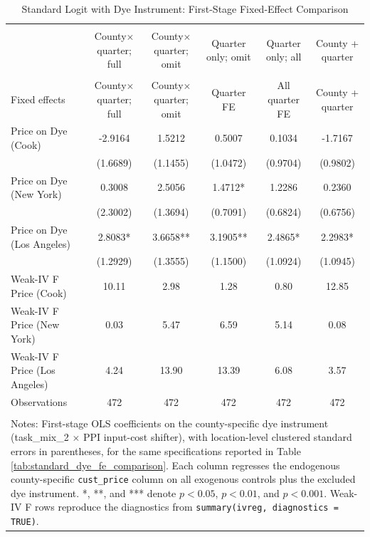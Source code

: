\begin{table}[!htbp] \centering
  \caption{Standard Logit with Dye Instrument: First-Stage Fixed-Effect Comparison}
  \label{tab:standard_dye_fe_comparison_first_stage}
  \begin{tabular}{lccccc}
\\[-1.8ex]\hline
\hline \\[-1.8ex]
 & County$\times$quarter; full & County$\times$quarter; omit & Quarter only; omit & Quarter only; all & County + quarter \\
\hline \\[-1.8ex]
Fixed effects & County$\times$quarter; full & County$\times$quarter; omit & Quarter FE & All quarter FE & County + quarter \\
Price on Dye (Cook) & -2.9164 & 1.5212 & 0.5007 & 0.1034 & -1.7167 \\
 & (1.6689) & (1.1455) & (1.0472) & (0.9704) & (0.9802) \\
Price on Dye (New York) & 0.3008 & 2.5056 & 1.4712* & 1.2286 & 0.2360 \\
 & (2.3002) & (1.3694) & (0.7091) & (0.6824) & (0.6756) \\
Price on Dye (Los Angeles) & 2.8083* & 3.6658** & 3.1905** & 2.4865* & 2.2983* \\
 & (1.2929) & (1.3555) & (1.1500) & (1.0924) & (1.0945) \\
Weak-IV F Price (Cook) & 10.11 & 2.98 & 1.28 & 0.80 & 12.85 \\
Weak-IV F Price (New York) & 0.03 & 5.47 & 6.59 & 5.14 & 0.08 \\
Weak-IV F Price (Los Angeles) & 4.24 & 13.90 & 13.39 & 6.08 & 3.57 \\
Observations & 472 & 472 & 472 & 472 & 472 \\
\hline \\[-1.8ex]
\multicolumn{6}{p{0.92\linewidth}}{\footnotesize Notes: First-stage OLS coefficients on the county-specific dye instrument (task\_mix\_2 $\times$ PPI input-cost shifter), with location-level clustered standard errors in parentheses, for the same specifications reported in Table \ref{tab:standard_dye_fe_comparison}. Each column regresses the endogenous county-specific \texttt{cust\_price} column on all exogenous controls plus the excluded dye instrument. *, **, and *** denote $p<0.05$, $p<0.01$, and $p<0.001$. Weak-IV F rows reproduce the diagnostics from \texttt{summary(ivreg, diagnostics = TRUE)}.}\\
\end{tabular}
\end{table}
